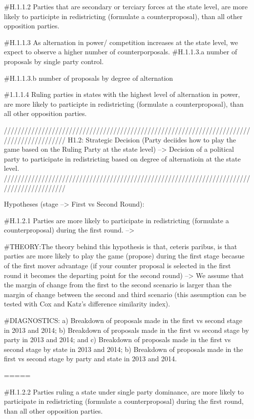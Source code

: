 \documentclass[]{article}
\begin{document}
\#H.1.1.2 Parties that are secondary or terciary forces at the state
level, are more likely to participte in redistricting (formulate a
counterproposal), than all other opposition parties.

\#H.1.1.3 As alternation in power/ competition increases at the state
level, we expect to observe a higher number of counterporposals.
\#H.1.1.3.a number of proposals by single party control.

\#H.1.1.3.b number of proposals by degree of alternation

\#1.1.1.4 Ruling parties in states with the highest level of alternation
in power, are more likely to participte in redistricting (formulate a
counterproposal), than all other opposition parties.

//////////////////////////////////////////////////////////////////////////////////////////
H1.2: Strategic Decision (Party deciides how to play the game based on
the Ruling Party at the state level) --\textgreater{} Decision of a
political party to participate in redistricting based on degree of
alternatioin at the state level.
//////////////////////////////////////////////////////////////////////////////////////////

Hypotheses (stage --\textgreater{} First vs Second Round):

\#H.1.2.1 Parties are more likely to participate in redistricting
(formulate a counterproposal) during the first round. --\textgreater{}

\#THEORY:The theory behind this hypothesis is that, ceteris paribus, is
that parties are more likely to play the game (propose) during the first
stage becasue of the first mover advantage (if your counter proposal is
selected in the first round it becomes the departing point for the
second round) --\textgreater{} We assume that the margin of change from
the first to the second scenario is larger than the margin of change
between the second and third scenario (this assumption can be tested
with Cox and Katz's difference similarity index).

\#DIAGNOSTICS: a) Breakdown of proposals made in the first vs second
stage in 2013 and 2014; b) Breakdown of proposals made in the first vs
second stage by party in 2013 and 2014; and c) Breakdown of proposals
made in the first vs second stage by state in 2013 and 2014; b)
Breakdown of proposals made in the first vs second stage by party and
state in 2013 and 2014.

=====

\#H.1.2.2 Parties ruling a state under single party dominance, are more
likely to participate in redistricting (formulate a counterproposal)
during the first round, than all other opposition parties.
\end{document}
